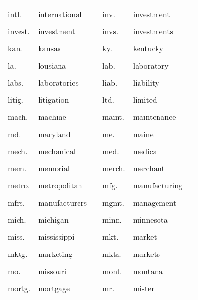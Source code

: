 \documentclass[10pt, letterpaper]{article}
\begin{document}
\begin{spacing}{1.0}
\begin{footnotesize}
\begin{longtable}[H]{p{1in}>{\raggedright}p{2in} p{0.2in} p{1in}>{\raggedright}p{2in} p{0in}}
    &  &  &  &  & \\[-6pt]
    intl. & international & & inv. & investment &\\
    &  &  &  &  & \\[-6pt]
    invest. & investment & & invs. & investments &\\
    &  &  &  &  & \\[-6pt]
    kan. & kansas & & ky. & kentucky &\\
    &  &  &  &  & \\[-6pt]
    la. & lousiana & & lab. & laboratory &\\
    &  &  &  &  & \\[-6pt]
    labs. & laboratories & & liab. & liability &\\
    &  &  &  &  & \\[-6pt]
    litig. & litigation & & ltd. & limited &\\
    &  &  &  &  & \\[-6pt]
    mach. & machine & & maint. & maintenance &\\
    &  &  &  &  & \\[-6pt]
    md. & maryland & & me. & maine &\\
    &  &  &  &  & \\[-6pt]
    mech. & mechanical & & med. & medical &\\
    &  &  &  &  & \\[-6pt]
    mem. & memorial & & merch. & merchant &\\
    &  &  &  &  & \\[-6pt]
    metro. & metropolitan & & mfg. & manufacturing &\\
    &  &  &  &  & \\[-6pt]
    mfrs. & manufacturers & & mgmt. & management &\\
    &  &  &  &  & \\[-6pt]
    mich. & michigan & & minn. & minnesota &\\
    &  &  &  &  & \\[-6pt]
    miss. & mississippi & & mkt. & market &\\
    &  &  &  &  & \\[-6pt]
    mktg. & marketing & & mkts. & markets &\\
    &  &  &  &  & \\[-6pt]
    mo. & missouri & & mont. & montana &\\
    &  &  &  &  & \\[-6pt]
    mortg. & mortgage & & mr. & mister &\\

\end{longtable}
\end{footnotesize}
\end{spacing}
\end{document}
